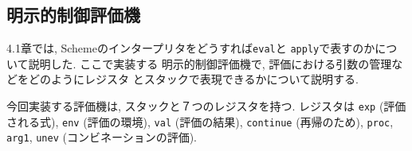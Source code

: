 \subsection{明示的制御評価機}
4.1章では, Schemeのインタープリタをどうすれば\lstinline{eval}と%
\lstinline{apply}で表すのかについて説明した. ここで実装する%
明示的制御評価機で, 評価における引数の管理などをどのようにレジスタ%
とスタックで表現できるかについて説明する.

今回実装する評価機は, スタックと７つのレジスタを持つ. レジスタは
\lstinline{exp} (評価される式), \lstinline{env} (評価の環境),
\lstinline{val} (評価の結果), \lstinline{continue} (再帰のため),
\lstinline{proc}, \lstinline{arg1}, \lstinline{unev} (コンビネーションの評価).
%

%

